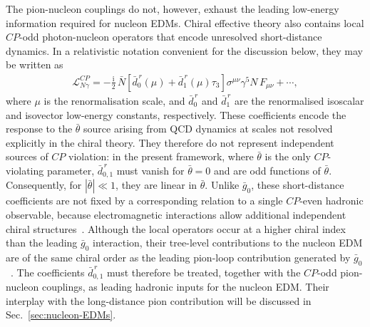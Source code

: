 \documentclass[review]{elsarticle}
\numberwithin{equation}{section}
\numberwithin{table}{section}
\numberwithin{figure}{section}
\def\i{\mathrm{i}}
\begin{document}
The pion-nucleon couplings do not, however, exhaust the leading low-energy information required for nucleon EDMs. Chiral effective theory also contains local $CP$-odd photon-nucleon operators that encode unresolved short-distance dynamics. In a relativistic notation convenient for the discussion below, they may be written as~\cite{Hockings:2005cn,Mereghetti:2010tp,Mereghetti:2010kp}
\begin{align}
    \mathcal{L}_{N\gamma}^{CP}
    =
    -\frac{\i}{2}\,
    \bar N
    \left[ \bar d_0^{\,r}(\mu) + \bar d_1^{\,r}(\mu)\tau_3
    \right] \sigma^{\mu\nu}\gamma^5N\,F_{\mu\nu}
    +\cdots ,
    \label{eq:CP-odd-Ngamma}
\end{align}
where $\mu$ is the renormalisation scale, and $\bar d_0^{\,r}$ and $\bar d_1^{\,r}$ are the renormalised isoscalar and isovector low-energy constants, respectively. These coefficients encode the response to the $\bar\theta$ source arising from QCD dynamics at scales not resolved explicitly in the chiral theory. They therefore do not represent independent sources of $CP$ violation: in the present framework, where $\bar\theta$ is the only $CP$-violating parameter, $\bar d_{0,1}^{\,r}$ must vanish for $\bar\theta=0$ and are odd functions of $\bar\theta$. Consequently, for $|\bar\theta|\ll1$, they are linear in $\bar\theta$. Unlike $\bar g_0$, these short-distance coefficients are not fixed by a corresponding relation to a single $CP$-even hadronic observable, because electromagnetic interactions allow additional independent chiral structures~\cite{Mereghetti:2010tp}.
Although the local operators occur at a higher chiral index than the leading $\bar g_0$ interaction, their tree-level contributions to the nucleon EDM are of the same chiral order as the leading pion-loop contribution generated by $\bar g_0$~\cite{Hockings:2005cn,Mereghetti:2010kp}. The coefficients $\bar d_{0,1}^{\,r}$ must therefore be treated, together with the $CP$-odd pion-nucleon couplings, as leading hadronic inputs for the nucleon EDM. Their interplay with the long-distance pion contribution will be discussed in Sec.~\ref{sec:nucleon-EDMs}.
\end{document}
